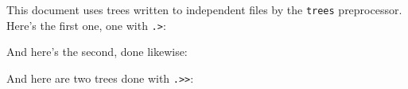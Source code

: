\documentclass[12pt]{article}
\begin{document}
This document uses trees written to independent files by the
{\tt trees} preprocessor.  Here's the first one, one with {\tt .>}:
\begin{example}

\end{example}
And here's the second, done likewise:
\begin{example}

\end{example}
And here are two trees done with {\tt .>>}:
\begin{examples}

\end{examples}
\end{document}
